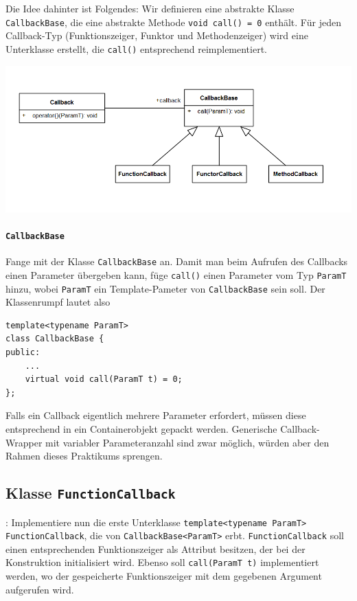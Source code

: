 Die Idee dahinter ist Folgendes:
Wir definieren eine abstrakte Klasse \lstinline{CallbackBase}, die eine abstrakte Methode \lstinline{void call() = 0} enthält.
Für jeden Callback-Typ (Funktionszeiger, Funktor und Methodenzeiger) wird eine Unterklasse erstellt, die \lstinline{call()} entsprechend reimplementiert.

\begin{center}
\includegraphics[width=.7\textwidth]{figures/callback_metamodel.png}
\end{center}

\paragraph*{\lstinline{CallbackBase}}

Fange mit der Klasse \lstinline{CallbackBase} an.
Damit man beim Aufrufen des Callbacks einen Parameter übergeben kann, füge \lstinline{call()} einen Parameter vom Typ \lstinline{ParamT} hinzu, wobei \lstinline{ParamT} ein Template-Pameter von \lstinline{CallbackBase} sein soll. Der Klassenrumpf lautet also

\begin{lstlisting}
template<typename ParamT>
class CallbackBase {
public:
	...
	virtual void call(ParamT t) = 0;
};
\end{lstlisting}

Falls ein Callback eigentlich mehrere Parameter erfordert, müssen diese entsprechend in ein Containerobjekt gepackt werden.
Generische Callback-Wrapper mit variabler Parameteranzahl sind zwar möglich, würden aber den Rahmen dieses Praktikums sprengen.


\subsection{Klasse \lstinline{FunctionCallback}}:
Implementiere nun die erste Unterklasse \lstinline{template<typename ParamT> FunctionCallback}, die von \lstinline{CallbackBase<ParamT>} erbt.  \lstinline{FunctionCallback} soll einen entsprechenden Funktionszeiger als Attribut besitzen, der bei der Konstruktion initialisiert wird.
Ebenso soll \lstinline{call(ParamT t)} implementiert werden, wo der gespeicherte Funktionszeiger mit dem gegebenen Argument aufgerufen wird.

